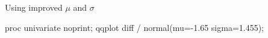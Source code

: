 \documentclass[unknownkeysallowed]{beamer}\usepackage[]{graphicx}\usepackage[]{color}
\begin{document}
\begin{frame}[fragile]{Using improved $\mu$ and $\sigma$}

\begin{Sascode}[store=ig]
  proc univariate noprint;
    qqplot diff / normal(mu=-1.65 sigma=1.455);
\end{Sascode}

  
\end{frame}

\end{document}
